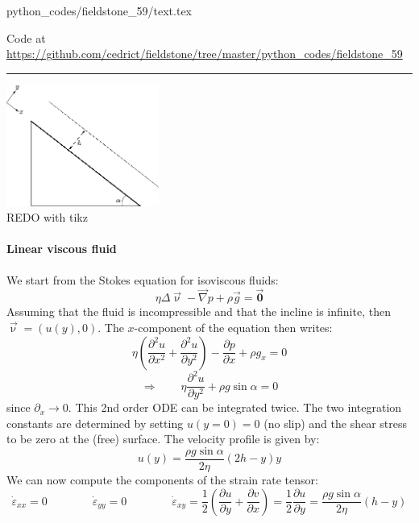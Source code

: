 \begin{flushright} {\tiny {\color{gray} python\_codes/fieldstone\_59/text.tex}} \end{flushright}



\begin{center}
Code at \url{https://github.com/cedrict/fieldstone/tree/master/python_codes/fieldstone_59}
\end{center}

\par\noindent\rule{\textwidth}{0.4pt}

\begin{center}
\includegraphics[width=5cm]{python_codes/fieldstone_59/images/setup}\\
{\captionfont REDO with tikz}
\end{center}

\paragraph{Linear viscous fluid}

We start from the Stokes equation for isoviscous fluids:
\[
\eta \Delta \vec{\upnu} - \vec\nabla p + \rho \vec{g} = \vec{\bm 0}
\]
Assuming that the fluid is incompressible and that the incline is infinite, 
then $\vec{\upnu}=(u(y),0)$.
The $x$-component of the equation then writes:
\[
\eta\left(\frac{\partial^2 u}{\partial x^2}+\frac{\partial^2 u}{\partial y^2} \right)
- \frac{\partial p}{\partial x} + \rho g_x =0
\]
\[
\Rightarrow \qquad 
\eta\frac{\partial^2 u}{\partial y^2} 
+ \rho g \sin\alpha =0
\]
since $\partial_x\rightarrow 0$.
This 2nd order ODE can be integrated twice. The two integration constants are 
determined by setting $u(y=0)=0$ (no slip) and the shear stress to be zero at the (free)
surface. The velocity profile is given by:
\[
u(y)=\frac{\rho g \sin \alpha}{2 \eta} (2h-y)y
\]
We can now compute the components of the strain rate tensor:
\[
\dot{\varepsilon}_{xx}=0
\qquad
\qquad
\dot{\varepsilon}_{yy}=0
\qquad
\qquad
\dot{\varepsilon}_{xy}
=\frac{1}{2} \left( \frac{\partial u}{\partial y} + \frac{\partial v}{\partial x} \right)
=\frac{1}{2} \frac{\partial u}{\partial y} 
= \frac{\rho g \sin \alpha}{2 \eta} (h-y)
\]

